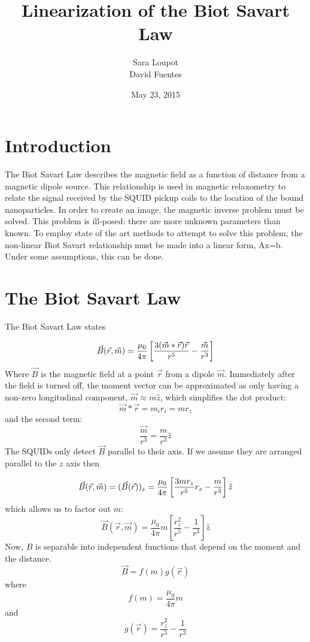 \documentclass[a4paper]{article}
\title{Linearization of the Biot Savart Law}
\author{Sara Loupot\\
        David Fuentes}
\date{May 23, 2015}
\begin{document}
\maketitle
\section{Introduction}
The Biot Savart Law describes the magnetic field as a function of distance from a magnetic dipole source.    This relationship is used in magnetic relaxometry to relate the signal received by the SQUID pickup coils to the location of the bound nanoparticles.  In order to create an image, the magnetic inverse problem must be solved.  This problem is ill-posed: there are more unknown parameters than known.  To employ state of the art methods to attempt to solve this problem, the non-linear Biot Savart relationship must be made into a linear form, Ax=b.  Under some assumptions, this can be done.

\section{The Biot Savart Law}
The Biot Savart Law states

\begin{equation}
\centering
  \vec{B}(\vec{r},\vec{m}) = \frac{\mu_{0}}{4\pi}
    \left[
      \frac{3(\vec{m}*\vec{r})\vec{r}}{r^{5}}-\frac{\vec{m}}{r^{3}}
    \right]
  \label{eq:BiotSavart}
\end{equation}
Where $\vec{B}$ is the magnetic field at a point $\vec{r}$ from a dipole
$\vec{m}$.  Immediately after the field is turned off, the moment vector can
be approximated as only having a non-zero longitudinal component, $\vec{m}
\approx m\hat{z}$, which simplifies the dot product:
\[\vec{m}*\vec{r}= m_{i}r_{i} = m r_{z}\]
and the second term:
\[\frac{\vec{m}}{r^{3}} = \frac{m }{r^{3}}\hat{z}\]
The SQUIDs only detect $\vec{B}$ parallel to their axis.  If we assume they are arranged parallel to the $z$ axis then

\begin{equation}
\centering
\vec{B}(\vec{r},\vec{m}) = (\vec{B}(\vec{r}))_{z} = \frac{\mu_{0}}{4\pi}
    \left[\frac{3m r_{z}}{r^{5}}r_{z} - \frac{m }{r^{3}}
    \right]\hat{z}
\end{equation}
which allows us to factor out $m $:
\begin{equation}
\vec{B}(\vec{r},\vec{m})=\frac{\mu_{0}}{4\pi}m [\frac{r_{z}^{2}}{r^{5}}-\frac{1}{r^{3}}]\hat{z}
\end{equation}
Now, $B$ is separable into  independent functions that depend on the moment
and the distance.
\begin{equation}
\vec{B} = f(m )g(\vec{r}) 
\end{equation}
where 
\begin{equation}
f(m ) = \frac{\mu_{0}}{4\pi}m 
\end{equation}
and 
\begin{equation} \label{eq:g}
g(\vec{r})=\frac{r_{z}^{2}}{r^{5}}-\frac{1}{r^{3}}
\end{equation}
\end{document}
